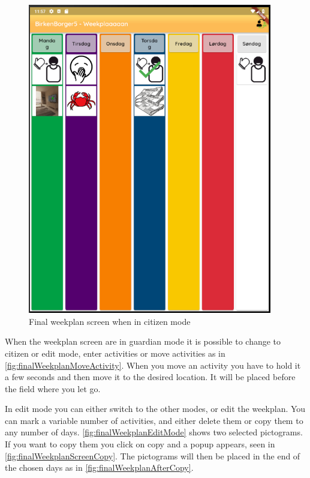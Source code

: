 \begin{figure}[H]
    \begin{center}
        \includegraphics[width=0.95\textwidth]{figures/FinalScreen/weekplanScreenCitizenMode.png}
    \end{center}
    \caption{Final weekplan screen when in citizen mode}
    \label{fig:finalWeekplanCitizenMode}
\end{figure}

When the weekplan screen are in guardian mode it is possible to change to citizen or edit mode, enter activities or move activities as in \ref{fig:finalWeekplanMoveActivity}. When you move an activity you have to hold it a few seconds and then move it to the desired location. It will be placed before the field where you let go.

In edit mode you can either switch to the other modes, or edit the weekplan. You can mark a variable number of activities, and either delete them or copy them to any number of days. \ref{fig:finalWeekplanEditMode} shows two selected pictograms. If you want to copy them you click on copy and a popup appears, seen in \ref{fig:finalWeekplanScreenCopy}. The pictograms will then be placed in the end of the chosen days as in \ref{fig:finalWeekplanAfterCopy}. 

